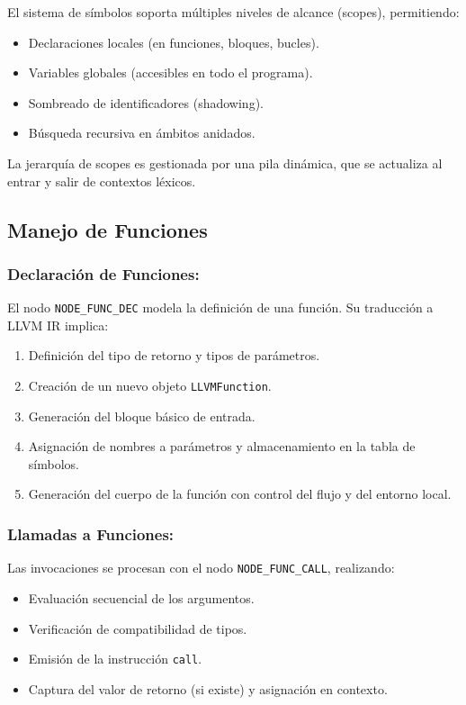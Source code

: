 \documentclass{llncs}
\begin{document}
El sistema de símbolos soporta múltiples niveles de alcance (scopes), permitiendo:
\begin{itemize}
    \item Declaraciones locales (en funciones, bloques, bucles).
    \item Variables globales (accesibles en todo el programa).
    \item Sombreado de identificadores (shadowing).
    \item Búsqueda recursiva en ámbitos anidados.
\end{itemize}

La jerarquía de scopes es gestionada por una pila dinámica, que se actualiza al entrar y salir de contextos léxicos.

\subsection{Manejo de Funciones}

\subsubsection{Declaración de Funciones:}

El nodo \texttt{NODE\_FUNC\_DEC} modela la definición de una función. Su traducción a LLVM IR implica:
\begin{enumerate}
    \item Definición del tipo de retorno y tipos de parámetros.
    \item Creación de un nuevo objeto \texttt{LLVMFunction}.
    \item Generación del bloque básico de entrada.
    \item Asignación de nombres a parámetros y almacenamiento en la tabla de símbolos.
    \item Generación del cuerpo de la función con control del flujo y del entorno local.
\end{enumerate}

\subsubsection{Llamadas a Funciones:}

Las invocaciones se procesan con el nodo \texttt{NODE\_FUNC\_CALL}, realizando:
\begin{itemize}
    \item Evaluación secuencial de los argumentos.
    \item Verificación de compatibilidad de tipos.
    \item Emisión de la instrucción \texttt{call}.
    \item Captura del valor de retorno (si existe) y asignación en contexto.
\end{itemize}
\end{document}
